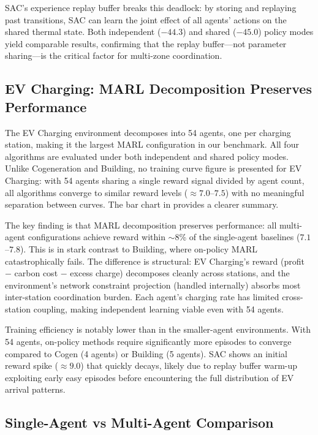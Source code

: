 SAC's experience replay buffer breaks this deadlock: by storing and replaying past transitions, SAC can learn the joint effect of all agents' actions on the shared thermal state. Both independent ($-44.3$) and shared ($-45.0$) policy modes yield comparable results, confirming that the replay buffer---not parameter sharing---is the critical factor for multi-zone coordination.

\subsection{EV Charging: MARL Decomposition Preserves Performance}
\label{sec:marl_evcharging}

The EV Charging environment decomposes into 54 agents, one per charging station, making it the largest MARL configuration in our benchmark. All four algorithms are evaluated under both independent and shared policy modes. Unlike Cogeneration and Building, no training curve figure is presented for EV Charging: with 54 agents sharing a single reward signal divided by agent count, all algorithms converge to similar reward levels ($\approx 7.0$--$7.5$) with no meaningful separation between curves. The bar chart in  provides a clearer summary.

The key finding is that MARL decomposition preserves performance: all multi-agent configurations achieve reward within $\sim$8\% of the single-agent baselines ($7.1$--$7.8$). This is in stark contrast to Building, where on-policy MARL catastrophically fails. The difference is structural: EV Charging's reward (profit $-$ carbon cost $-$ excess charge) decomposes cleanly across stations, and the environment's network constraint projection (handled internally) absorbs most inter-station coordination burden. Each agent's charging rate has limited cross-station coupling, making independent learning viable even with 54 agents.

Training efficiency is notably lower than in the smaller-agent environments. With 54 agents, on-policy methods require significantly more episodes to converge compared to Cogen (4 agents) or Building (5 agents). SAC shows an initial reward spike ($\approx 9.0$) that quickly decays, likely due to replay buffer warm-up exploiting early easy episodes before encountering the full distribution of EV arrival patterns.

\subsection{Single-Agent vs Multi-Agent Comparison}
\label{sec:marl_sa_vs_ma}

